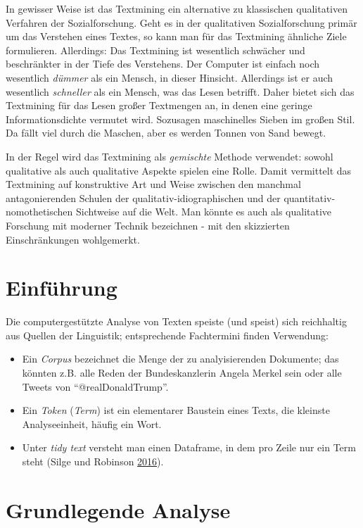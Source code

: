 \documentclass[12pt,ngerman,]{book}
\begin{document}
In gewisser Weise ist das Textmining ein alternative zu klassischen
qualitativen Verfahren der Sozialforschung. Geht es in der qualitativen
Sozialforschung primär um das Verstehen eines Textes, so kann man für
das Textmining ähnliche Ziele formulieren. Allerdings: Das Textmining
ist wesentlich schwächer und beschränkter in der Tiefe des Verstehens.
Der Computer ist einfach noch wesentlich \emph{dümmer} als ein Mensch,
in dieser Hinsicht. Allerdings ist er auch wesentlich \emph{schneller}
als ein Mensch, was das Lesen betrifft. Daher bietet sich das Textmining
für das Lesen großer Textmengen an, in denen eine geringe
Informationsdichte vermutet wird. Sozusagen maschinelles Sieben im
großen Stil. Da fällt viel durch die Maschen, aber es werden Tonnen von
Sand bewegt.

In der Regel wird das Textmining als \emph{gemischte} Methode verwendet:
sowohl qualitative als auch qualitative Aspekte spielen eine Rolle.
Damit vermittelt das Textmining auf konstruktive Art und Weise zwischen
den manchmal antagonierenden Schulen der qualitativ-idiographischen und
der quantitativ-nomothetischen Sichtweise auf die Welt. Man könnte es
auch als qualitative Forschung mit moderner Technik bezeichnen - mit den
skizzierten Einschränkungen wohlgemerkt.

\section{Einführung}\label{einfuhrung-2}

Die computergestützte Analyse von Texten speiste (und speist) sich
reichhaltig aus Quellen der Linguistik; entsprechende Fachtermini finden
Verwendung:

\begin{itemize}
\item
  Ein \emph{Corpus} bezeichnet die Menge der zu analyisierenden
  Dokumente; das könnten z.B. alle Reden der Bundeskanzlerin Angela
  Merkel sein oder alle Tweets von ``@realDonaldTrump''.
\item
  Ein \emph{Token} (\emph{Term}) ist ein elementarer Baustein eines
  Texts, die kleinste Analyseeinheit, häufig ein Wort.
\item
  Unter \emph{tidy text} versteht man einen Dataframe, in dem pro Zeile
  nur ein Term steht (Silge und Robinson
  \protect\hyperlink{ref-Silge2016}{2016}).
\end{itemize}

\section{Grundlegende Analyse}\label{grundlegende-analyse}
\end{document}
